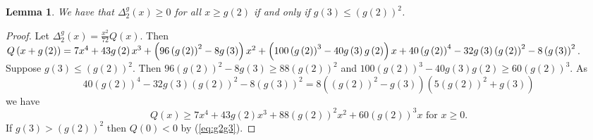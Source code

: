 \documentclass[11pt,reqno]{amsart}
\theoremstyle{plain}
\newtheorem{lemma}[theorem]{Lemma}
\theoremstyle{remark}
\theoremstyle{definition}
\numberwithin{equation}{section}
\begin{document}
\begin{lemma}
We have that
$\Delta _{2}^{g}\left( x\right) \geq 0$
for all $x\geq g\left( 2\right) $ if and only if
$g\left( 3\right) \leq
\left( g\left( 2\right) \right) ^{2}$.
\end{lemma}

\begin{proof}
Let $\Delta _{2}^{g}\left( x\right) =\frac{x^{2}}{72}Q\left( x\right) $.
Then
$Q\left( x+g\left( 2\right) \right) =7\*x^4
 + 43\*g\left( 2\right) \*x^3
 + \left(96\*\left( g\left( 2\right) \right) ^2
 - 8\*g\left( 3\right) \right) \*x^2
 + \left(100\*\left( g\left( 2\right) \right) ^3
 - 40\*g\left( 3\right) \*g\left( 2\right) \right) \*x
 + 40\*\left( g\left( 2\right) \right) ^4
 - 32\*g\left( 3\right) \*\left( g\left( 2\right) \right) ^2
 - 8\*\left( g\left( 3\right) \right) ^2
 $.
Suppose
$g\left( 3\right)
\leq \left( g\left( 2\right) \right) ^{2}$.
Then
$96\left( g\left( 2\right) \right) ^{2}-8g\left( 3\right) \geq 88
\left( g\left( 2\right) \right) ^{2}$
and
$100
\left( g\left( 2\right) \right) ^{3}-
40g\left( 3\right) g\left( 2\right) \geq 60\left( g\left( 2\right) \right) ^{3}$.
As
\begin{equation}
40\left( g\left( 2\right) \right) ^{4}-32g\left( 3\right) \left( g\left( 2\right) \right) ^{2}-8\left( g\left( 3\right) \right) ^{2}
=8\left( \left( g\left( 2\right) \right) ^{2}
-g\left( 3\right) \right) 
\left( 5\left( g\left( 2\right) \right) ^{2}
+g\left( 3\right) \right) \label{eq:g2g3}
\end{equation}
we have
$$Q
\left( x\right) \geq
7x^{4}+43
g\left( 2\right) x^{3}+88
\left( g\left( 2\right) \right) ^{2}x^{2}+60
\left( g\left( 2\right) \right) ^{
3}x \text{ for }x\geq 0. $$
If $g\left( 3\right) >\left( g\left( 2\right) \right) ^{2}$ then
$Q\left( 0\right) <0$ by (\ref{eq:g2g3}).
\end{proof}





















\end{document}
